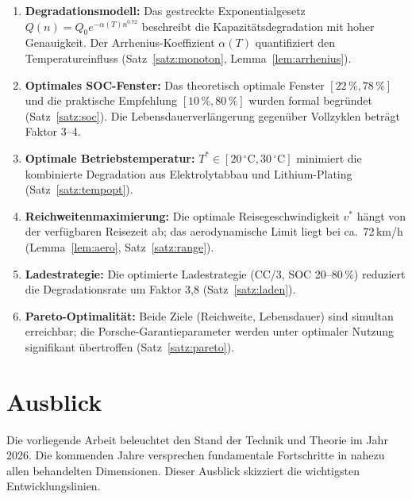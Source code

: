 ﻿\documentclass[a4paper,12pt]{article}
\theoremstyle{definition}
\begin{document}
\begin{enumerate}
  \item \textbf{Degradationsmodell:} Das gestreckte Exponentialgesetz
    $Q(n) = Q_0 e^{-\alpha(T) n^{0.72}}$ beschreibt die Kapazit\"atsdegradation
    mit hoher Genauigkeit. Der Arrhenius-Koeffizient $\alpha(T)$ quantifiziert
    den Temperatureinfluss (Satz~\ref{satz:monoton}, Lemma~\ref{lem:arrhenius}).

  \item \textbf{Optimales SOC-Fenster:} Das theoretisch optimale Fenster
    $[22\,\%, 78\,\%]$ und die praktische Empfehlung $[10\,\%, 80\,\%]$ wurden
    formal begründet (Satz~\ref{satz:soc}). Die Lebensdauerverl\"angerung
    gegen\"uber Vollzyklen betr\"agt Faktor 3--4.

  \item \textbf{Optimale Betriebstemperatur:} $T^* \in [20\,^{\circ}\mathrm{C}, 30\,^{\circ}\mathrm{C}]$
    minimiert die kombinierte Degradation aus Elektrolytabbau und Lithium-Plating
    (Satz~\ref{satz:tempopt}).

  \item \textbf{Reichweitenmaximierung:} Die optimale Reisegeschwindigkeit
    $v^*$ h\"angt von der verfügbaren Reisezeit ab; das aerodynamische Limit
    liegt bei ca.\ 72\,km/h (Lemma~\ref{lem:aero}, Satz~\ref{satz:range}).

  \item \textbf{Ladestrategie:} Die optimierte Ladestrategie (CC/3, SOC 20--80\,\%)
    reduziert die Degradationsrate um Faktor 3{,}8 (Satz~\ref{satz:laden}).

  \item \textbf{Pareto-Optimalit\"at:} Beide Ziele (Reichweite, Lebensdauer)
    sind simultan erreichbar; die Porsche-Garantieparameter werden unter
    optimaler Nutzung signifikant \"ubertroffen (Satz~\ref{satz:pareto}).
\end{enumerate}

\section{Ausblick}

Die vorliegende Arbeit beleuchtet den Stand der Technik und Theorie im Jahr 2026.
Die kommenden Jahre versprechen fundamentale Fortschritte in nahezu allen
behandelten Dimensionen. Dieser Ausblick skizziert die wichtigsten
Entwicklungslinien.
\end{document}

